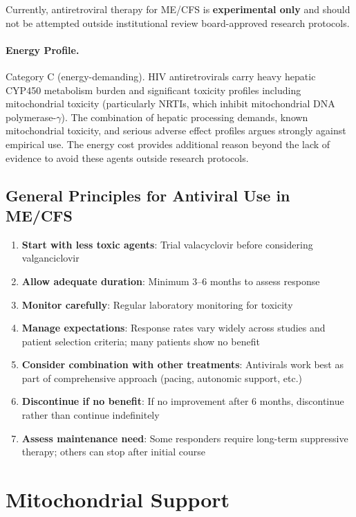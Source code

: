 Currently, antiretroviral therapy for ME/CFS is \textbf{experimental only} and should not be attempted outside institutional review board-approved research protocols.

\paragraph{Energy Profile.}
Category C (energy-demanding). HIV antiretrovirals carry heavy hepatic CYP450 metabolism burden and significant toxicity profiles including mitochondrial toxicity (particularly NRTIs, which inhibit mitochondrial DNA polymerase-$\gamma$). The combination of hepatic processing demands, known mitochondrial toxicity, and serious adverse effect profiles argues strongly against empirical use. The energy cost provides additional reason beyond the lack of evidence to avoid these agents outside research protocols.

\subsection{General Principles for Antiviral Use in ME/CFS}

\begin{enumerate}
    \item \textbf{Start with less toxic agents}: Trial valacyclovir before considering valganciclovir
    \item \textbf{Allow adequate duration}: Minimum 3--6 months to assess response
    \item \textbf{Monitor carefully}: Regular laboratory monitoring for toxicity
    \item \textbf{Manage expectations}: Response rates vary widely across studies and patient selection criteria; many patients show no benefit
    \item \textbf{Consider combination with other treatments}: Antivirals work best as part of comprehensive approach (pacing, autonomic support, etc.)
    \item \textbf{Discontinue if no benefit}: If no improvement after 6 months, discontinue rather than continue indefinitely
    \item \textbf{Assess maintenance need}: Some responders require long-term suppressive therapy; others can stop after initial course
\end{enumerate}

\section{Mitochondrial Support}
\label{sec:mitochondrial-support}

